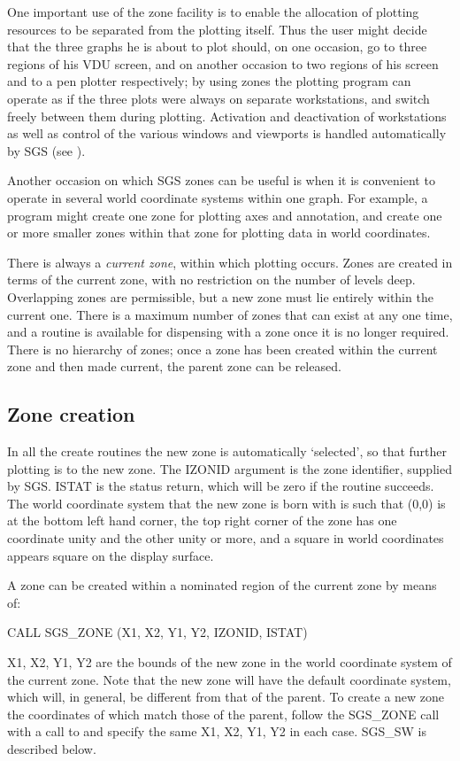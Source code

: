 \documentclass[11pt]{starlink}
\begin{document}
One important use of the zone
facility is to enable the allocation of plotting
resources to be separated from the plotting itself.  Thus
the user might decide that the three graphs he is about
to plot should, on one occasion, go to three regions of
his VDU screen, and on another occasion to two regions
of his screen and to a pen plotter respectively;  by using
zones the plotting program can operate as if the three
plots were always on separate workstations, and switch freely
between them during plotting.  Activation and deactivation
of workstations as well as
control of the various windows and viewports is handled automatically
by SGS (see ).

Another occasion on which SGS zones can be useful is when
it is convenient to operate in
several world coordinate systems within one graph.  For
example, a program might create one zone
for plotting axes and annotation, and create one or more smaller
zones within that zone for plotting data in world
coordinates.

There is always a \emph{current zone}, within which plotting
occurs.  Zones are created in terms of the current
zone, with no restriction on the number of levels deep.  Overlapping
zones are permissible, but a new zone
must lie entirely within the
current one.  There is a maximum number of
zones that can exist at any one time, and a routine is available for
dispensing with a zone once it is no longer required.  There
is no hierarchy of zones;  once a zone has been created within
the current zone and then made current, the
parent zone can be
released.

\subsection {Zone creation}

In all the create 
routines the new zone is automatically `selected',
so that further plotting is to the new zone.  The IZONID
argument is the zone identifier, supplied by SGS.  ISTAT
is the status return, which will be zero if the routine succeeds.  The
world coordinate system that the new zone is born with is such
that (0,0) is at the bottom left hand corner,
the top right
corner of the zone has one
coordinate unity and the other unity or more,
and a
square in world coordinates appears square
on the display surface.

A zone can be created within a nominated region of the current
zone by means of:
\begin{terminalv}
CALL SGS_ZONE (X1, X2, Y1, Y2, IZONID, ISTAT)
\end{terminalv}
X1, X2, Y1, Y2 are the bounds of the new zone in the world coordinate
system of the current zone.  Note that the new zone will have
the default coordinate system, which will, in general, be
different from that of the parent.  To create a new zone the
coordinates of which match those of the parent, follow the
SGS\_ZONE call with a call to  and specify the same
X1, X2, Y1, Y2 in each case.  SGS\_SW is described below.
\end{document}
